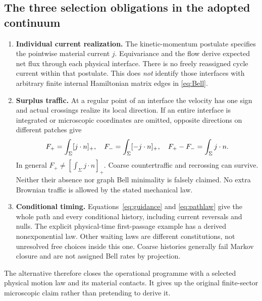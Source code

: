 \documentclass[11pt]{article}
\theoremstyle{definition}\newtheorem{assumption}[theorem]{Constitutive assumption}
\theoremstyle{remark}\newtheorem{remark}[theorem]{Remark}
\begin{document}
\subsection{The three selection obligations in the adopted continuum}
\begin{enumerate}
\item \textbf{Individual current realization.} The kinetic-momentum postulate specifies the pointwise material current $j$. Equivariance and the flow derive expected net flux through each physical interface. There is no freely reassigned cycle current within that postulate. This does \emph{not} identify those interfaces with arbitrary finite internal Hamiltonian matrix edges in \eqref{eq:Bell}.
\item \textbf{Surplus traffic.} At a regular point of an interface the velocity has one sign and actual crossings realize its local direction. If an entire interface is integrated or microscopic coordinates are omitted, opposite directions on different patches give
\[
 F_+=\int_\Sigma[j\cdot n]_+,\quad F_-=\int_\Sigma[-j\cdot n]_+,\quad
 F_+-F_-=\int_\Sigma j\cdot n.
\]
In general $F_+\ne[\int_\Sigma j\cdot n]_+$. Coarse countertraffic and recrossing can survive. Neither their absence nor graph Bell minimality is falsely claimed. No extra Brownian traffic is allowed by the stated mechanical law.
\item \textbf{Conditional timing.} Equations~\eqref{eq:guidance} and \eqref{eq:pathlaw} give the whole path and every conditional history, including current reversals and nulls. The explicit physical-time first-passage example has a derived nonexponential law. Other waiting laws are different constitutions, not unresolved free choices inside this one. Coarse histories generally fail Markov closure and are not assigned Bell rates by projection.
\end{enumerate}
The alternative therefore closes the operational programme with a selected physical motion law and its material contacts. It gives up the original finite-sector microscopic claim rather than pretending to derive it.
\end{document}
